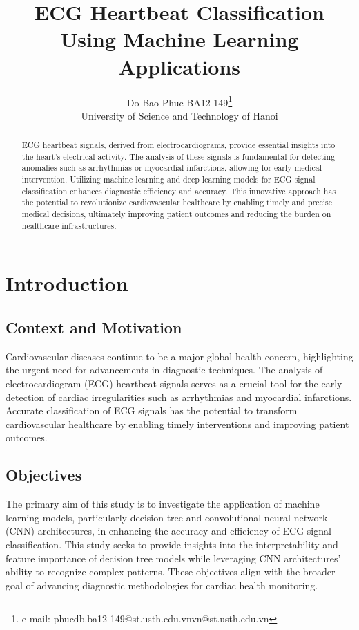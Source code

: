 \documentclass[]{acmsiggraph}
\title{ECG Heartbeat Classification Using Machine Learning Applications}
\author{Do Bao Phuc BA12-149\thanks{e-mail: phucdb.ba12-149@st.usth.edu.vnvn@st.usth.edu.vn}\\University of Science and Technology of Hanoi}
\begin{document}
\maketitle


\begin{abstract}
ECG heartbeat signals, derived from electrocardiograms, provide essential insights into the heart’s electrical activity. The analysis of these signals is fundamental for detecting anomalies such as arrhythmias or myocardial infarctions, allowing for early medical intervention. Utilizing machine learning and deep learning models for ECG signal classification enhances diagnostic efficiency and accuracy. This innovative approach has the potential to revolutionize cardiovascular healthcare by enabling timely and precise medical decisions, ultimately improving patient outcomes and reducing the burden on healthcare infrastructures.
\end{abstract}

\section{Introduction}
\subsection{Context and Motivation}
Cardiovascular diseases continue to be a major global health concern, highlighting the urgent need for advancements in diagnostic techniques. The analysis of electrocardiogram (ECG) heartbeat signals serves as a crucial tool for the early detection of cardiac irregularities such as arrhythmias and myocardial infarctions. Accurate classification of ECG signals has the potential to transform cardiovascular healthcare by enabling timely interventions and improving patient outcomes.

\subsection{Objectives}
The primary aim of this study is to investigate the application of machine learning models, particularly decision tree and convolutional neural network (CNN) architectures, in enhancing the accuracy and efficiency of ECG signal classification. This study seeks to provide insights into the interpretability and feature importance of decision tree models while leveraging CNN architectures' ability to recognize complex patterns. These objectives align with the broader goal of advancing diagnostic methodologies for cardiac health monitoring.
\end{document}
